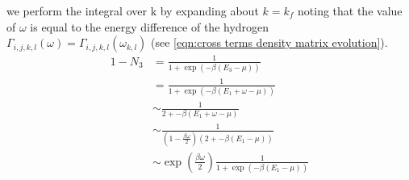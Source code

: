 we perform the integral over k by expanding about
\(k = k_f\) noting that the value of
\(\omega \) is equal to the energy
difference of the hydrogen
\(\Gamma_{i,j, k,l}(\omega) = \Gamma_{i,j, k,l}(\omega_{k,l})\)
(see \cref{eqn:cross terms density matrix evolution}).
\begin{align}
  1 - N_3 & = \frac{1}{1 + \exp{(-\beta(E_3 - \mu))}}                                  \\
          & = \frac{1}{1 + \exp{(-\beta(E_1 + \omega - \mu))}}                         \\
          & \sim \frac{1}{2 + -\beta(E_1 + \omega - \mu)}                              \\
          & \sim \frac{1}{(1 - \frac{\beta \omega}{2})(2 + -\beta(E_1  - \mu))}        \\
          & \sim \exp{(\frac{\beta \omega}{2})}\frac{1}{1 + \exp{(-\beta(E_1 - \mu))}}
\end{align}

